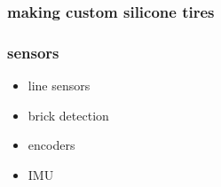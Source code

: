 \documentclass{beamer}
\begin{document}
\begin{frame}
  
  \frametitle{\bf making custom silicone tires}


\end{frame}





\begin{frame}
  
  \frametitle{\bf sensors}

  \begin{itemize}
    \item line sensors
    \item brick detection
    \item encoders
    \item IMU
  \end{itemize}

\end{frame}
\end{document}
